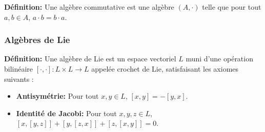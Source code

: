 \textbf{Définition:}
Une algèbre commutative est une algèbre $(A, \cdot)$ telle que pour tout $a, b \in A$, $a \cdot b = b \cdot a$.

\subsubsection{Algèbres de Lie}

\textbf{Définition:}
Une algèbre de Lie est un espace vectoriel $L$ muni d'une opération bilinéaire $[\cdot, \cdot] : L \times L \to L$ appelée crochet de Lie, satisfaisant les axiomes suivants :
\begin{itemize}
    \item \textbf{Antisymétrie:} Pour tout $x, y \in L$, $[x, y] = -[y, x]$.
    \item \textbf{Identité de Jacobi:} Pour tout $x, y, z \in L$, $[x, [y, z]] + [y, [z, x]] + [z, [x, y]] = 0$.
\end{itemize}